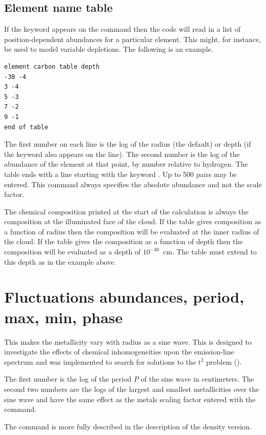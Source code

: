 \subsection{Element name table}

If the keyword  appears on
the  command then the code
will read in a list of position-dependent abundances for
a particular element.
This might, for instance, be used to model variable depletions.
The following is an example.
\begin{verbatim}
element carbon table depth
-30 -4
3 -4
5 -3
7 -2
9 -1
end of table
\end{verbatim}

The first number on each line is the log of the radius (the default)
or depth (if the keyword  also appears
on the  line).
The second number is the
log of the abundance of the element at that point, by number relative to
hydrogen.
The table ends with a line starting with the keyword
.
Up to 500 pairs may be entered.
This command always specifies the absolute
abundance and not the scale factor.

The chemical composition printed at the start of the calculation is always
the composition at the illuminated face of the cloud.  If the table gives
composition as a function of radius then the composition will be evaluated
at the inner radius of the cloud.  If the table gives the composition as
a function of depth then the composition will be evaluated as a depth of
$10^{-30}$~cm.  The table must extend to this depth as in the example above.

\section{Fluctuations abundances, period, max, min, phase}

This makes the metallicity vary with radius as a sine wave.  This is
designed to investigate the effects of chemical inhomogeneities upon the
emission-line spectrum and was implemented to search for solutions to the
$t^2$ problem (\citealp{KingdonFerland1995}).

The first number is the log of the period $P$ of the sine wave in
centimeters.
The second two numbers are the logs of the largest and smallest
metallicities over the sine wave and have the same effect as the metals
scaling factor entered with the  command.

The  command is more fully described in
the description of the density version.

